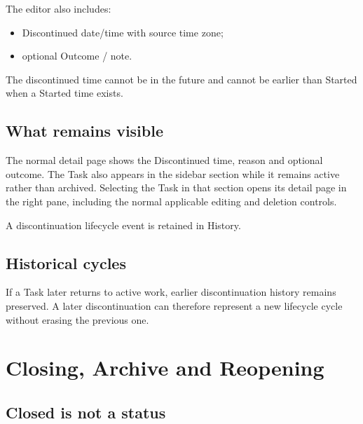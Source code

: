 \documentclass{testudomanual}
\begin{document}
The editor also includes:
\begin{itemize}
    \item Discontinued date/time with source time zone;
    \item optional Outcome / note.
\end{itemize}

The discontinued time cannot be in the future and cannot be earlier than Started when a Started time exists.

\section{What remains visible}

The normal detail page shows the Discontinued time, reason and optional outcome. The Task also appears in the  sidebar section while it remains active rather than archived. Selecting the Task in that section opens its detail page in the right pane, including the normal applicable editing and deletion controls.

A discontinuation lifecycle event is retained in History.

\section{Historical cycles}

If a Task later returns to active work, earlier discontinuation history remains preserved. A later discontinuation can therefore represent a new lifecycle cycle without erasing the previous one.


\chapter{Closing, Archive and Reopening}

\section{Closed is not a status}
\end{document}
